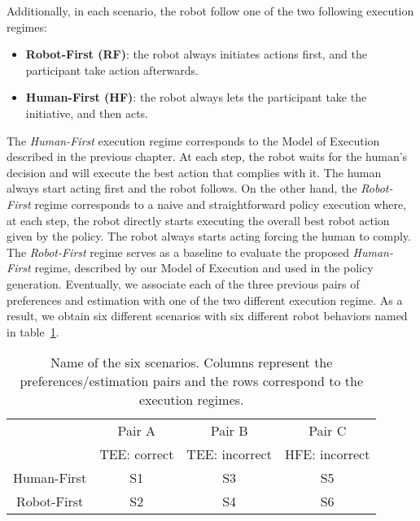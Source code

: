 Additionally, in each scenario, the robot follow one of the two following execution regimes:
\begin{itemize}
    \item \textbf{Robot-First (RF)}: the robot always initiates actions first, and the participant take action afterwards.
    \item \textbf{Human-First (HF)}: the robot always lets the participant take the initiative, and then acts.
\end{itemize}
The \textit{Human-First} execution regime corresponds to the Model of Execution described in the previous chapter. At each step, the robot waits for the human's decision and will execute the best action that complies with it. The human always start acting first and the robot follows. On the other hand, the \textit{Robot-First} regime corresponds to a naive and straightforward policy execution where, at each step, the robot directly starts executing the overall best robot action given by the policy. The robot always starts acting forcing the human to comply. The \textit{Robot-First} regime serves as a baseline to evaluate the proposed \textit{Human-First} regime, described by our Model of Execution and used in the policy generation.
Eventually, we associate each of the three previous pairs of preferences and estimation with one of the two different execution regime. As a result, we obtain six different scenarios with six different robot behaviors named in table~\ref{tab:scenario_names}.

\begin{table}
    \caption{Name of the six scenarios. 
    Columns represent the preferences/estimation pairs and the rows correspond to the execution regimes.}
    \begin{center}
    \begin{tabular}{c|c|c|c|}
        \cline{2-4}
                                                & Pair A        & Pair B            & Pair C\\
                                                & TEE: correct  & TEE: incorrect    & HFE: incorrect\\
        \hline
        \multicolumn{1}{|c|}{Human-First}       & S1            & S3                & S5\\
        \hline
        \multicolumn{1}{|c|}{Robot-First}       & S2            & S4                & S6\\
        \hline
    \end{tabular}
    \end{center}
    \label{tab:scenario_names}
\end{table}


